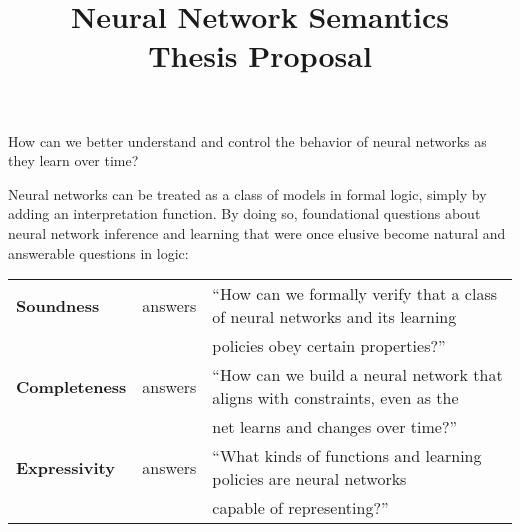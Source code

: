 \documentclass[letterpaper]{article}
\title{Neural Network Semantics\\Thesis Proposal}
\begin{document}
\maketitle

\begin{question}
How can we better understand and control the behavior of neural networks as they learn over time?
\end{question}

\begin{thesis}
Neural networks can be treated as a class of models in formal logic, simply by adding an interpretation function.  By doing so, foundational questions about neural network inference and learning that were once elusive become natural and answerable questions in logic:

\begin{tabular}{lcl}
    \textbf{Soundness} & answers & ``How can we formally verify that a class of neural networks and its learning\\
    & & \quad policies obey certain properties?''\\
    \textbf{Completeness} & answers & ``How can we build a neural network that aligns with constraints, even as the\\
    & & \quad net learns and changes over time?''\\
    \textbf{Expressivity} & answers & ``What kinds of functions and learning policies are neural networks\\
    & & \quad capable of representing?''\\
\end{tabular}
\end{thesis}
\end{document}
